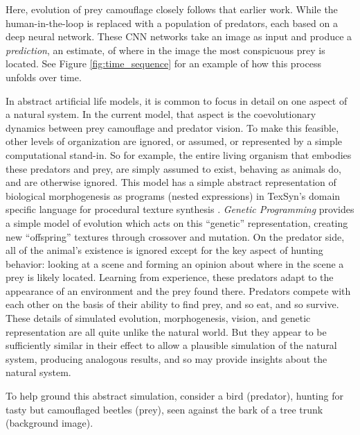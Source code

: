 \documentclass[letterpaper]{article}
\newcommand{\jargon}[1]{\textit{#1}}
\newcommand{\texsyn}[0]{TexSyn}
\begin{document}

Here, evolution of prey camouflage closely follows that earlier work. While the human-in-the-loop is replaced with a population of predators, each based on a deep neural network. These CNN networks take an image as input and produce a \jargon{prediction}, an estimate, of where in the image the most conspicuous prey is located. See Figure \ref{fig:time_sequence} for an example of how this process unfolds over time.
\par
In abstract artificial life models, it is common to focus in detail on one aspect of a natural system. In the current model, that aspect is the coevolutionary dynamics between prey camouflage and predator vision. To make this feasible, other levels of organization are ignored, or assumed, or represented by a simple computational stand-in. So for example, the entire living organism that embodies these predators and prey, are simply assumed to exist, behaving as animals do, and are otherwise ignored. This model has a simple abstract representation of biological morphogenesis as programs (nested expressions) in \texsyn{}'s domain specific language for procedural texture synthesis \citep{reynolds_texsyn_2019}. \jargon{Genetic Programming} provides a simple model of evolution which acts on this “genetic” representation, creating new “offspring” textures through crossover and mutation. On the predator side, all of the animal's existence is ignored except for the key aspect of hunting behavior: looking at a scene and forming an opinion about where in the scene a prey is likely located. Learning from experience, these predators adapt to the appearance of an environment and the prey found there. Predators compete with each other on the basis of their ability to find prey, and so eat, and so survive. These details of simulated evolution, morphogenesis, vision, and genetic representation are all quite unlike the natural world. But they appear to be sufficiently similar in their effect to allow a plausible simulation of the natural system, producing analogous results, and so may provide insights about the natural system.
\par
To help ground this abstract simulation, consider a bird (predator), hunting for tasty but camouflaged beetles (prey), seen against the bark of a tree trunk (background image).
\par


\end{document}
